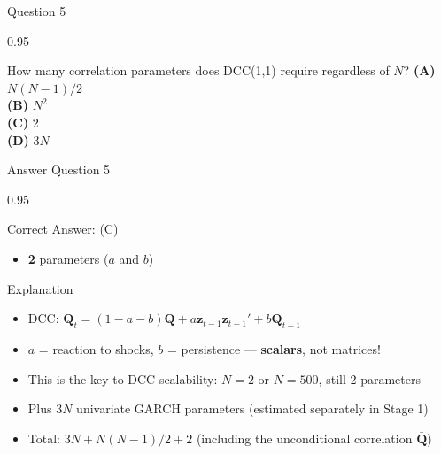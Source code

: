 \documentclass[9pt, aspectratio=169, t]{beamer}
\begin{document}
\begin{frame}{Question 5}
    \begin{cminipage}{0.95\textwidth}
    \begin{block}{How many correlation parameters does DCC(1,1) require regardless of $N$?}
        \textcolor{MainBlue}{\textbf{(A)}} $N(N-1)/2$\\[3pt]
        \textcolor{MainBlue}{\textbf{(B)}} $N^2$\\[3pt]
        \textcolor{MainBlue}{\textbf{(C)}} 2\\[3pt]
        \textcolor{MainBlue}{\textbf{(D)}} $3N$
    \end{block}
    \end{cminipage}
\end{frame}

\begin{frame}{Answer Question 5}
    \begin{cminipage}{0.95\textwidth}
    \begin{exampleblock}{Correct Answer: (C)}
        \begin{itemize}\setlength{\itemsep}{0pt}
            \item \textbf{2} parameters ($a$ and $b$)
        \end{itemize}
    \end{exampleblock}

    \pause
    \begin{block}{Explanation}
        \begin{itemize}\setlength{\itemsep}{0pt}
            \item DCC: $\mathbf{Q}_t = (1-a-b)\bar{\mathbf{Q}} + a\mathbf{z}_{t-1}\mathbf{z}_{t-1}' + b\mathbf{Q}_{t-1}$
            \item $a$ = reaction to shocks, $b$ = persistence --- \textbf{scalars}, not matrices!
            \item This is the key to DCC scalability: $N = 2$ or $N = 500$, still 2 parameters
            \item Plus $3N$ univariate GARCH parameters (estimated separately in Stage 1)
            \item Total: $3N + N(N-1)/2 + 2$ (including the unconditional correlation $\bar{\mathbf{Q}}$)
        \end{itemize}
    \end{block}
    \end{cminipage}
\end{frame}
\end{document}
